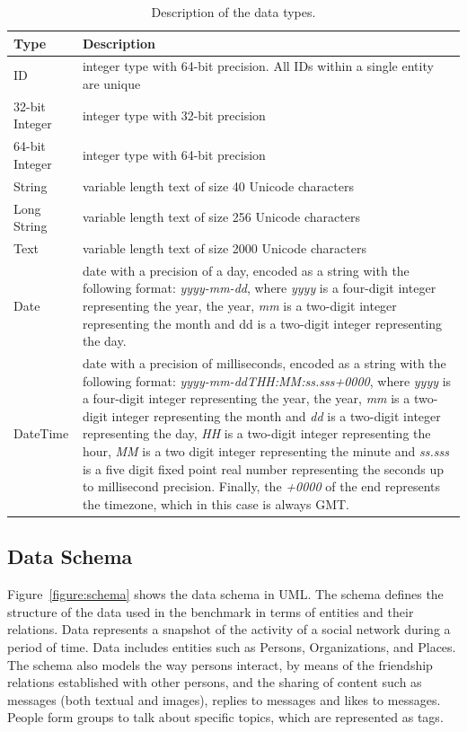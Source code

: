 \begin{table}[h]
\centering
\begin{tabular}{|p{2.5cm}|p{13cm}|}
    \hline
    \textbf{Type} & \textbf{Description} \\
    \hline
    ID &  integer type with 64-bit precision. All IDs within a single entity are unique\\
    \hline
    32-bit Integer &  integer type with 32-bit precision\\
    \hline
    64-bit Integer &  integer type with 64-bit precision\\
    \hline
    String & variable length text of size 40 Unicode characters\\
    \hline
    Long String & variable length text of size 256 Unicode characters\\
    \hline
    Text &  variable length text of size 2000 Unicode characters\\
    \hline
    Date &  date with a precision of a day, encoded as a string with the following format: \textit{yyyy-mm-dd}, where \textit{yyyy} is a four-digit integer representing the year,
    the year, \textit{mm} is a two-digit integer representing the month and dd is a two-digit integer representing the day. \\
    \hline
    DateTime &  date with a precision of milliseconds, encoded as a string with the following format: \textit{yyyy-mm-ddTHH:MM:ss.sss+0000}, where \textit{yyyy} is a four-digit integer representing the year,
    the year, \textit{mm} is a two-digit integer representing the month and \textit{dd} is a two-digit integer representing the day, \textit{HH} is a two-digit integer representing the hour, \textit{MM} is a two
    digit integer representing the minute and \textit{ss.sss} is a five digit fixed point real number representing the seconds up to millisecond precision. Finally, the \textit{+0000} of the end represents the
    timezone, which in this case is always GMT.\\
    \hline
\end{tabular}
\caption{Description of the data types.}
\label{table:types}
\end{table}


\subsection{Data Schema}

Figure~\ref{figure:schema} shows the data schema in UML. The schema defines the
structure of the data used in the benchmark in terms of entities and their
relations. Data represents a snapshot of the activity of a social network
during a period of time. Data includes entities such as Persons, Organizations,
and Places. The schema also models the way persons interact, by means of the
friendship relations established with other persons, and the sharing of content
such as messages (both textual and images), replies to messages and likes to
messages.  People form groups to talk about specific topics, which are
represented as tags.

